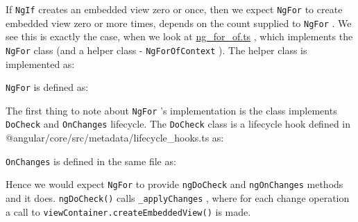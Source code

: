 If
\texttt{NgIf}
creates an embedded view zero or once, then we expect
\texttt{NgFor}
to create
embedded view zero or more times, depends on the count supplied to
\texttt{NgFor}
. We see
this is exactly the case, when we look at
\url{ng_for_of.ts}
, which implements the
\texttt{NgFor}
class (and a helper class -
\texttt{NgForOfContext}
). The helper class is implemented as:



\texttt{NgFor}
is defined as:



The first thing to note about
\texttt{NgFor}
’s implementation is the class implements
\texttt{DoCheck}
and
\texttt{OnChanges}
lifecycle. The
\texttt{DoCheck}
class is a lifecycle hook defined in
@angular/core/src/metadata/lifecycle\_hooks.ts as:



\texttt{OnChanges}
is defined in the same file as:



Hence we would expect
\texttt{NgFor}
to provide
\texttt{ngDoCheck}
and
\texttt{ngOnChanges}
methods and it
does.
\texttt{ngDoCheck()}
calls
\texttt{\_applyChanges}
, where for each change operation a call to
\texttt{viewContainer.createEmbeddedView()}
is made.
